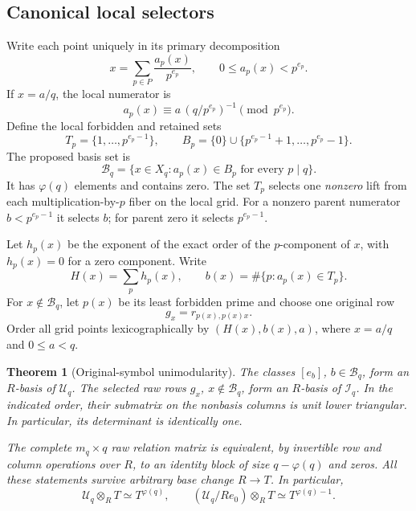 \documentclass[11pt]{article}
\numberwithin{equation}{section}
\newtheorem{theorem}{Theorem}[section]
\theoremstyle{definition}
\theoremstyle{remark}
\newcommand{\U}{\mathcal U}
\newcommand{\I}{\mathcal I}
\newcommand{\B}{\mathcal B}
\begin{document}
\subsection{Canonical local selectors}
Write each point uniquely in its primary decomposition
\begin{equation}
 x=\sum_{p\in P}\frac{a_p(x)}{p^{e_p}},\qquad
 0\le a_p(x)<p^{e_p}.
 \label{eq:CRT}
\end{equation}
If $x=a/q$, the local numerator is
\[
 a_p(x)\equiv a\,(q/p^{e_p})^{-1}\pmod {p^{e_p}}.
\]
Define the local forbidden and retained sets
\begin{equation}
 T_p=\{1,\ldots,p^{e_p-1}\},\qquad
 B_p=\{0\}\cup\{p^{e_p-1}+1,\ldots,p^{e_p}-1\}.
 \label{eq:selectors}
\end{equation}
The proposed basis set is
\begin{equation}
 \B_q=\{x\in X_q:a_p(x)\in B_p\text{ for every }p\mid q\}.
 \label{eq:basis}
\end{equation}
It has $\varphi(q)$ elements and contains zero.
The set $T_p$ selects one \emph{nonzero} lift from each multiplication-by-$p$
fiber on the local grid. For a nonzero parent numerator
$b<p^{e_p-1}$ it selects $b$; for parent zero it selects
$p^{e_p-1}$.

Let $h_p(x)$ be the exponent of the exact order of the $p$-component of
$x$, with $h_p(x)=0$ for a zero component. Write
\[
 H(x)=\sum_p h_p(x),\qquad
 b(x)=\#\{p:a_p(x)\in T_p\}.
\]
For $x\notin\B_q$, let $p(x)$ be its least forbidden prime and choose
one original row
\begin{equation}
 g_x=r_{p(x),p(x)x}.
 \label{eq:selected}
\end{equation}
Order all grid points lexicographically by
$(H(x),b(x),a)$, where $x=a/q$ and $0\le a<q$.

\begin{theorem}[Original-symbol unimodularity]
\label{thm:unimodular}
The classes $[e_b]$, $b\in\B_q$, form an $R$-basis of $\U_q$.
The selected raw rows $g_x$, $x\notin\B_q$, form an $R$-basis of
$\I_q$. In the indicated order, their submatrix on the nonbasis columns
is unit lower triangular. In particular, its determinant is identically
one.

The complete $m_q\times q$ raw relation matrix is equivalent, by
invertible row and column operations over $R$, to an identity block of
size $q-\varphi(q)$ and zeros. All these statements survive arbitrary
base change $R\to T$. In particular,
\[
 \U_q\otimes_R T\simeq T^{\varphi(q)},\qquad
 (\U_q/Re_0)\otimes_R T\simeq T^{\varphi(q)-1}.
\]
\end{theorem}
\end{document}
